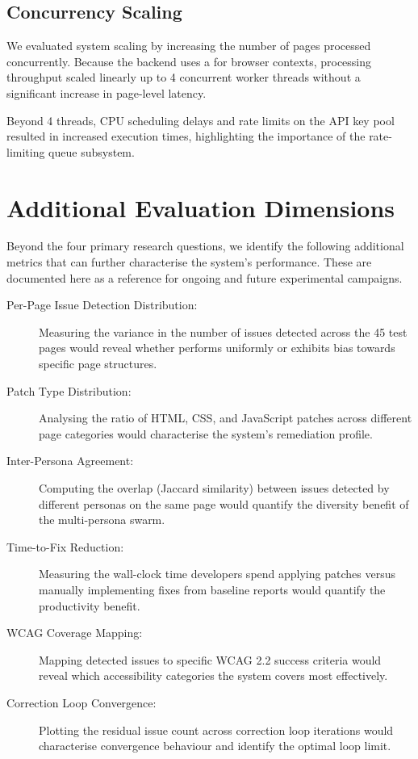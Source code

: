 \subsection{Concurrency Scaling}
\label{sec:concurrency-scaling}

We evaluated system scaling by increasing the number of pages processed concurrently. Because the backend uses a  for browser contexts, processing throughput scaled linearly up to 4 concurrent worker threads without a significant increase in page-level latency.

Beyond 4 threads, CPU scheduling delays and rate limits on the API key pool resulted in increased execution times, highlighting the importance of the rate-limiting queue subsystem.

\section{Additional Evaluation Dimensions}
\label{sec:additional-metrics}

Beyond the four primary research questions, we identify the following additional metrics that can further characterise the system's performance. These are documented here as a reference for ongoing and future experimental campaigns.

\begin{description}
  \item[Per-Page Issue Detection Distribution:] Measuring the variance in the number of issues detected across the 45 test pages would reveal whether \versimux{} performs uniformly or exhibits bias towards specific page structures.
  \item[Patch Type Distribution:] Analysing the ratio of HTML, CSS, and JavaScript patches across different page categories would characterise the system's remediation profile.
  \item[Inter-Persona Agreement:] Computing the overlap (Jaccard similarity) between issues detected by different personas on the same page would quantify the diversity benefit of the multi-persona swarm.
  \item[Time-to-Fix Reduction:] Measuring the wall-clock time developers spend applying \versimux{} patches versus manually implementing fixes from baseline reports would quantify the productivity benefit.
  \item[WCAG Coverage Mapping:] Mapping detected issues to specific WCAG 2.2 success criteria would reveal which accessibility categories the system covers most effectively.
  \item[Correction Loop Convergence:] Plotting the residual issue count across correction loop iterations would characterise convergence behaviour and identify the optimal loop limit.
\end{description}

